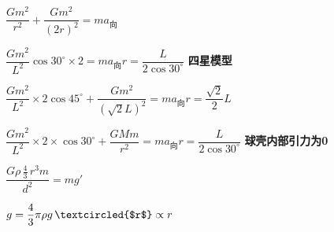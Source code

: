 
$\dfrac{Gm^{2}}{r^{2}}+\dfrac{Gm^{2}}{(2r)^{2}}=ma_{\text{向}}$


$\dfrac{Gm^{2}}{L^{2}}\cos30^{\circ}\times2=ma_{\text{向}}$\qquad $r=\dfrac{L}{2\cos30^{\circ}}$
\textbf{四星模型}


$\dfrac{Gm^{2}}{L^{2}}\times2\cos45^{\circ}+\dfrac{Gm^{2}}{(\sqrt{2}L)^{2}}=ma_{\text{向}}$\qquad $r=\dfrac{\sqrt{2}}{2}L$


$\dfrac{Gm^{2}}{L^{2}}\times2\times\cos30^{\circ}+\dfrac{GMm}{r^{2}}=ma_{\text{向}}$\qquad $r=\dfrac{L}{2\cos30^{\circ}}$
\textbf{球壳内部引力为0}


$\dfrac{G\rho\,\frac{4}{3}\,r^{3}m}{d^{2}}=mg'$%

$g=\dfrac{4}{3}\pi\rho g\,\textcircled{$r$}\propto r$%


